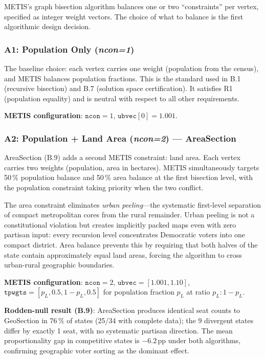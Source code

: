 METIS's graph bisection algorithm balances one or two ``constraints'' per vertex,
specified as integer weight vectors.
The choice of what to balance is the first algorithmic design decision.

\subsubsection*{A1: Population Only (\textit{ncon=1})}

The baseline choice: each vertex carries one weight (population from the census),
and METIS balances population fractions.
This is the standard used in B.1 (recursive bisection) and B.7 (solution space
certification).
It satisfies R1 (population equality) and is neutral with respect to all other
requirements.

\textbf{METIS configuration}: $\mathtt{ncon}=1$, $\mathtt{ubvec}[0]=1.001$.

\subsubsection*{A2: Population + Land Area (\textit{ncon=2}) --- AreaSection}

AreaSection (B.9) adds a second METIS constraint: land area.
Each vertex carries two weights (population, area in hectares).
METIS simultaneously targets 50\,\% population balance and 50\,\% area balance
at the first bisection level, with the population constraint taking priority
when the two conflict.

The area constraint eliminates \emph{urban peeling}---the systematic first-level
separation of compact metropolitan cores from the rural remainder.
Urban peeling is not a constitutional violation but creates implicitly packed
maps even with zero partisan input: every recursion level concentrates Democratic
voters into one compact district.
Area balance prevents this by requiring that both halves of the state contain
approximately equal land areas, forcing the algorithm to cross urban-rural
geographic boundaries.

\textbf{METIS configuration}: $\mathtt{ncon}=2$,
$\mathtt{ubvec}=[1.001, 1.10]$,
$\mathtt{tpwgts}=[p_L, 0.5, 1-p_L, 0.5]$ for population fraction $p_L$ at ratio $p_L:1-p_L$.

\textbf{Rodden-null result (B.9)}: AreaSection produces identical seat counts to
GeoSection in 76\,\% of states (25/34 with complete data); the 9 divergent states
differ by exactly 1 seat, with no systematic partisan direction.
The mean proportionality gap in competitive states is $-6.2$\,pp under both
algorithms, confirming geographic voter sorting as the dominant effect.

